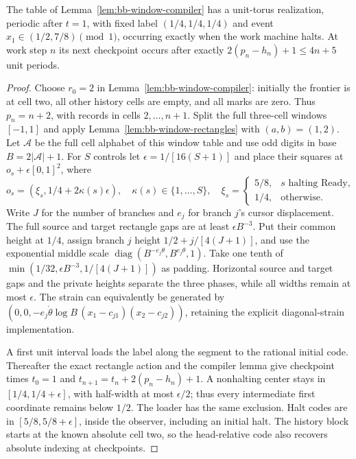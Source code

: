 \begin{proposition}\label{thm:bb-window37}
The table of Lemma~\ref{lem:bb-window-compiler} has a unit-torus
realization, periodic after $t=1$, with fixed label $(1/4,1/4,1/4)$
and event $x_1\in(1/2,7/8)\pmod1$, occurring exactly when the
work machine halts.  At work step $n$ its next
checkpoint occurs after exactly $2(p_n-h_n)+1\le4n+5$ unit periods.
\end{proposition}
\begin{proof}\label{proof:bb-window37}
Choose $r_0=2$ in Lemma~\ref{lem:bb-window-compiler}: initially the
frontier is at cell two, all other history cells are empty, and all
marks are zero. Thus $p_n=n+2$, with records in cells $2,\ldots,n+1$.
Split the full three-cell windows $[-1,1]$ and apply
Lemma~\ref{lem:bb-window-rectangles} with $(a,b)=(1,2)$.
Let $\mathcal A$ be the full cell alphabet of this window table and use
odd digits in base $B=2|\mathcal A|+1$.
For $S$ controls let $\epsilon=1/[16(S+1)]$ and place their squares
at $o_s+\epsilon[0,1]^2$, where
\[
 o_s=(\xi_s,1/4+2\kappa(s)\epsilon),\quad
 \kappa(s)\in\{1,\ldots,S\},\quad
 \xi_s=\begin{cases}5/8,&s\text{ halting Ready},\\1/4,&\text{otherwise}.
 \end{cases}
\]
Write $J$ for the number of branches and $e_j$ for branch $j$'s cursor
displacement. The full source and target rectangle gaps are at least
$\epsilon B^{-3}$.  Put their common height at $1/4$, assign branch
$j$ height $1/2+j/[4(J+1)]$, and use the exponential middle scale
$\operatorname{diag}(B^{-e_j\theta},B^{e_j\theta},1)$.
Take one tenth of
$\min(1/32,\epsilon B^{-3},1/[4(J+1)])$ as padding.
Horizontal source and target gaps and the private heights separate
the three phases, while all widths remain at most $\epsilon$.
The strain can equivalently be generated by
$(0,0,-e_j\dot\theta\log B\,(x_1-c_{j1})(x_2-c_{j2}))$,
retaining the explicit diagonal-strain implementation.

A first unit interval loads the label along the segment to the rational
initial code.  Thereafter the exact rectangle action and the compiler
lemma give checkpoint times $t_0=1$ and
$t_{n+1}=t_n+2(p_n-h_n)+1$.  A nonhalting center stays in
$[1/4,1/4+\epsilon]$, with half-width at most $\epsilon/2$;
thus every intermediate first coordinate remains below $1/2$.
The loader has the same exclusion.  Halt codes are in
$[5/8,5/8+\epsilon]$, inside the observer, including an initial halt.
The history block starts at the known absolute cell two, so the
head-relative code also recovers absolute indexing at checkpoints.
\end{proof}

